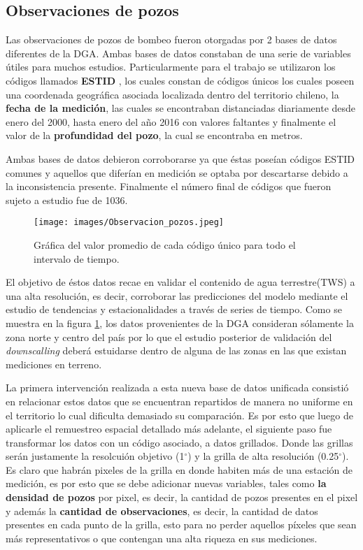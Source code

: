     \subsection{Observaciones de pozos}
    Las observaciones de pozos de bombeo fueron otorgadas por 2 bases de datos diferentes de la DGA. Ambas bases de datos constaban de una serie de variables útiles para muchos estudios.
    Particularmente para el trabajo se utilizaron los códigos llamados \textbf{ESTID} \cite{gwl}, los cuales constan de códigos únicos los cuales poseen una coordenada geográfica asociada localizada dentro
    del territorio chileno, la \textbf{fecha de la medición}, las cuales se encontraban distanciadas diariamente desde enero del 2000, hasta enero del año 2016 con valores faltantes y finalmente el valor de la \textbf{profundidad del pozo},
    la cual se encontraba en metros.

    Ambas bases de datos debieron corroborarse ya que éstas poseían códigos ESTID comunes y aquellos que diferían en medición se optaba por descartarse debido a la inconsistencia presente.
    Finalmente el número final de códigos que fueron sujeto a estudio fue de 1036. 

    \begin{figure}[H]
        \centering
              \texttt{[image: images/Observacion\_pozos.jpeg]}
        \caption[Datos de Pozos DGA sin procesar]{\footnotesize Gráfica del valor promedio de cada código único para todo el intervalo de tiempo.}
        \label{pozosDGA}
    \end{figure}

    El objetivo de éstos datos recae en validar el contenido de agua terrestre(TWS) a una alta resolución, es decir, corroborar las predicciones del modelo mediante el estudio de tendencias y estacionalidades a través de series de tiempo. 
    Como se muestra en la figura \ref{pozosDGA}, los datos provenientes de la DGA consideran sólamente la zona norte y centro del país por lo que el estudio posterior de validación del
    \textit{downscalling} deberá estuidarse dentro de alguna de las zonas en las que existan mediciones en terreno.

    La primera intervención realizada a esta nueva base de datos unificada consistió en relacionar estos datos que se encuentran repartidos de manera no uniforme en el territorio
    lo cual dificulta demasiado su comparación. Es por esto que luego de aplicarle el remuestreo espacial detallado más adelante, el siguiente paso fue transformar los datos con un código asociado,
    a datos grillados. Donde las grillas serán justamente la resolcuión objetivo (1$^{\circ}$) y la grilla de alta resolución (0.25$^{\circ}$). Es claro que habrán pixeles de la grilla en donde 
    habiten más de una estación de medición, es por esto que se debe adicionar nuevas variables, tales como \textbf{la densidad de pozos} por pixel, es decir, la cantidad de pozos presentes en el pixel y además
    la \textbf{cantidad de observaciones}, es decir, la cantidad de datos presentes en cada punto de la grilla, esto para no perder aquellos píxeles que sean más representativos o que 
    contengan una alta riqueza en sus mediciones.

